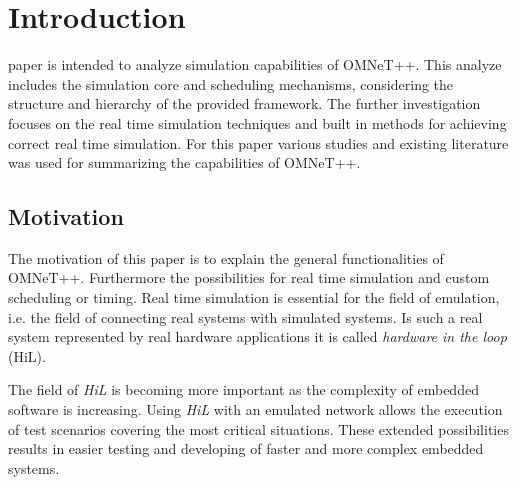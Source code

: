 \documentclass[journal]{IEEEtran}
\begin{document}
%
\IEEEpeerreviewmaketitle



\section{Introduction}
% 
% 
% 
% 
 paper is intended to analyze simulation capabilities of OMNeT++.
This analyze includes the simulation core and scheduling mechanisms, considering the structure and hierarchy of the provided framework.
The further investigation focuses on the real time simulation techniques and built in methods for achieving correct real time simulation.
For this paper various studies and existing literature was used for summarizing the capabilities of OMNeT++.

\subsection{Motivation}
The motivation of this paper is to explain the general functionalities of OMNeT++.
Furthermore the possibilities for real time simulation and custom scheduling or timing.
Real time simulation is essential for the field of emulation, i.e. the field of connecting real systems with simulated systems.
Is such a real system represented by real hardware applications it is called \emph{hardware in the loop} (HiL).

The field of \emph{HiL} is becoming more important as the complexity of embedded software is increasing.
Using \emph{HiL} with an emulated network allows the execution of test scenarios covering the most critical situations.
These extended possibilities results in easier testing and developing of faster and more complex embedded systems.
\end{document}
